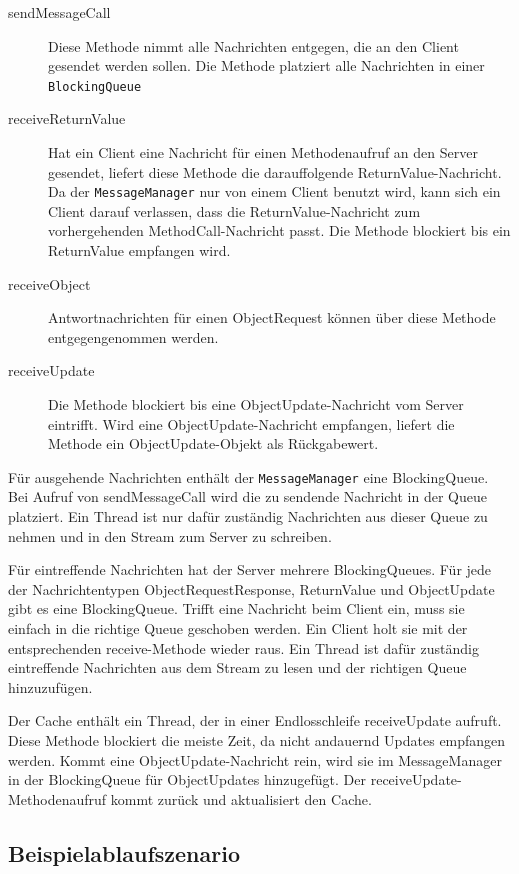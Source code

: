 \begin{description}
\item[sendMessageCall] Diese Methode nimmt alle Nachrichten entgegen, die an den Client gesendet werden sollen. Die Methode platziert alle Nachrichten in einer \verb|BlockingQueue| 
\item[receiveReturnValue] Hat ein Client eine Nachricht für einen Methodenaufruf an den Server gesendet, liefert diese Methode die darauffolgende ReturnValue-Nachricht. Da der \verb+MessageManager+ nur von einem Client benutzt wird, kann sich ein Client darauf verlassen, dass die ReturnValue-Nachricht zum vorhergehenden MethodCall-Nach\-richt \-passt.  Die Methode blockiert bis ein ReturnValue empfangen wird.
\item[receiveObject] Antwortnachrichten für einen ObjectRequest können über diese Methode entgegengenommen werden. 
\item[receiveUpdate] Die Methode blockiert bis eine ObjectUpdate-Nachricht vom Server eintrifft. Wird eine ObjectUpdate-Nachricht empfangen, liefert die Methode ein ObjectUpdate-Objekt als Rückgabewert.
\end{description}

Für ausgehende Nachrichten enthält der \verb|MessageManager| eine BlockingQueue. Bei Aufruf von sendMessageCall wird die zu sendende Nachricht in der Queue platziert. Ein Thread ist nur dafür zuständig Nachrichten aus dieser Queue zu nehmen und in den Stream zum Server zu schreiben.


Für eintreffende Nachrichten hat der Server mehrere BlockingQueues. Für jede der Nachrichtentypen ObjectRequestResponse, ReturnValue und ObjectUpdate gibt es eine BlockingQueue. Trifft eine Nachricht beim Client ein, muss sie einfach in die richtige Queue geschoben werden. Ein Client holt sie mit der entsprechenden receive-Methode wieder raus. Ein Thread ist dafür zuständig eintreffende Nachrichten aus dem Stream zu lesen und der richtigen Queue hinzuzufügen. 

Der Cache enthält ein Thread, der in einer Endlosschleife receiveUpdate aufruft. Diese Methode blockiert die meiste Zeit, da nicht andauernd Updates empfangen werden. Kommt eine ObjectUpdate-Nachricht rein, wird sie im MessageManager in der BlockingQueue für ObjectUpdates hinzugefügt. Der receiveUpdate-Methodenaufruf kommt zurück und aktualisiert den Cache.

\subsection{Beispielablaufszenario}
\label{sec:beisp}

